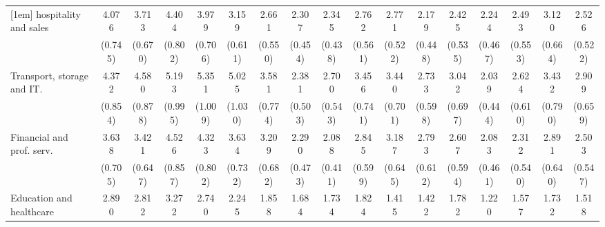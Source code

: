 {\begin{tabular}{l*{16}{c}}
[1em]
hospitality and sales&       4.076\sym{***}&       3.713\sym{***}&       4.404\sym{***}&       3.979\sym{***}&       3.159\sym{***}&       2.661\sym{***}&       2.307\sym{***}&       2.345\sym{***}&       2.762\sym{***}&       2.771\sym{***}&       2.179\sym{***}&       2.425\sym{***}&       2.244\sym{***}&       2.493\sym{***}&       3.120\sym{***}&       2.526\sym{***}\\
                    &     (0.745)         &     (0.670)         &     (0.802)         &     (0.706)         &     (0.611)         &     (0.550)         &     (0.454)         &     (0.438)         &     (0.561)         &     (0.522)         &     (0.448)         &     (0.535)         &     (0.467)         &     (0.553)         &     (0.664)         &     (0.522)         \\
[1em]
Transport, storage and IT.&       4.372\sym{***}&       4.580\sym{***}&       5.193\sym{***}&       5.351\sym{***}&       5.025\sym{***}&       3.581\sym{***}&       2.381\sym{***}&       2.700\sym{***}&       3.456\sym{***}&       3.440\sym{***}&       2.733\sym{***}&       3.042\sym{***}&       2.039\sym{**} &       2.624\sym{***}&       3.432\sym{***}&       2.909\sym{***}\\
                    &     (0.854)         &     (0.878)         &     (0.995)         &     (1.009)         &     (1.030)         &     (0.774)         &     (0.503)         &     (0.543)         &     (0.741)         &     (0.701)         &     (0.598)         &     (0.697)         &     (0.444)         &     (0.610)         &     (0.790)         &     (0.659)         \\
[1em]
Financial and prof. serv.&       3.638\sym{***}&       3.421\sym{***}&       4.526\sym{***}&       4.323\sym{***}&       3.634\sym{***}&       3.209\sym{***}&       2.290\sym{***}&       2.088\sym{***}&       2.845\sym{***}&       3.187\sym{***}&       2.793\sym{***}&       2.607\sym{***}&       2.083\sym{***}&       2.312\sym{***}&       2.891\sym{***}&       2.503\sym{***}\\
                    &     (0.705)         &     (0.647)         &     (0.857)         &     (0.802)         &     (0.732)         &     (0.682)         &     (0.473)         &     (0.411)         &     (0.599)         &     (0.645)         &     (0.612)         &     (0.594)         &     (0.461)         &     (0.540)         &     (0.640)         &     (0.547)         \\
[1em]
Education and healthcare&       2.890\sym{***}&       2.812\sym{***}&       3.272\sym{***}&       2.740\sym{***}&       2.245\sym{***}&       1.858\sym{**} &       1.684\sym{*}  &       1.734\sym{*}  &       1.824\sym{**} &       1.415         &       1.422         &       1.782\sym{*}  &       1.220         &       1.577         &       1.732\sym{*}  &       1.518         \\

\end{tabular}}
